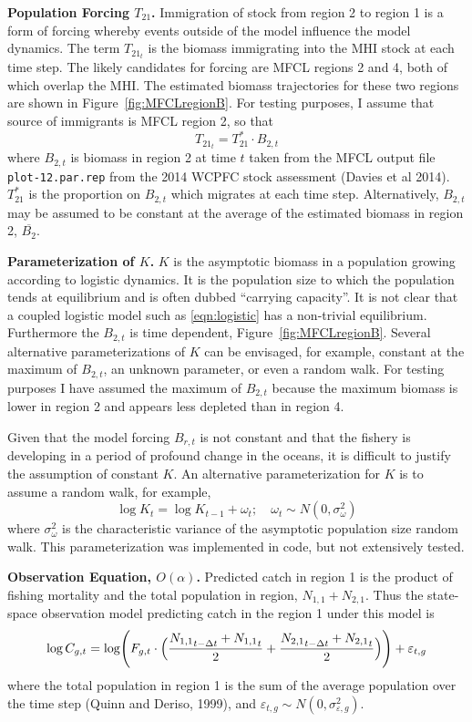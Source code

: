 \documentclass[12pt,letterpaper]{article}
\newcommand\widebar[1]{\overline{#1}}
\newcommand\None{{N_{1,1}}}
\newcommand\Ntwo{{N_{2,1}}}
\begin{document}
{\bf Population Forcing $T_{21}$.}
Immigration of stock from region 2 to region 1 is a
form of forcing whereby events outside of the model influence the
model dynamics. The term $T_{{21}_t}$ is the biomass immigrating
into the MHI stock at each time step. 
The likely candidates for forcing are MFCL regions 2 and 4, both of
which overlap the MHI. The estimated biomass trajectories for these
two regions are shown in Figure~\ref{fig:MFCLregionB}.
For testing purposes,
I assume that source of immigrants is MFCL region 2, so that
\begin{equation}
T_{{21}_t} = T^*_{21}\cdot B_{2,t}
\end{equation}
where $B_{2,t}$ is biomass in region 2 at time $t$ taken from the MFCL output file
{\tt plot-12.par.rep} from the 2014 WCPFC stock assessment
(Davies et al 2014). $T^*_{21}$ is the proportion on
$B_{2,t}$ which migrates at each time step.
Alternatively, $B_{2,t}$ may be assumed to be constant at the average
of the estimated biomass in region 2, $\widebar{B_{2}}$.

{\bf Parameterization of $K$.}
$K$ is the asymptotic biomass in a population growing according to
logistic dynamics. It is the population size to which the population
tends at equilibrium and is often dubbed ``carrying capacity''. 
It is not clear that a coupled logistic model such as
\ref{eqn:logistic} has a non-trivial equilibrium. Furthermore the
$B_{2,t}$ is time dependent, Figure~\ref{fig:MFCLregionB}.
Several alternative
parameterizations of $K$ can be envisaged, for example, constant at
the maximum of $B_{2,t}$, an unknown parameter, or even a random walk.
For testing purposes I have assumed the maximum of $B_{2,t}$ because
the maximum biomass is lower in region 2 and appears less depleted
than in region 4.

Given that the model forcing $B_{r,t}$ is not constant and that the
fishery is developing in a period of profound change in the oceans,
it is difficult to justify the assumption of constant $K$. An
alternative parameterization for $K$ is to assume a random walk, for
example,
\begin{equation}
\log K_t = \log K_{t-1} + \omega_t;\quad \omega_t\sim
N(0,\sigma^2_\omega) \label{eqn:Kwalk}
\end{equation}
where  $\sigma^2_\omega$ is the characteristic variance of the
asymptotic population size random walk.
This parameterization was implemented in code, but not extensively
tested.

{\bf Observation Equation, $O(\alpha)$.}
Predicted catch in region 1 is the product of fishing mortality
and the total population in region, $\None+\Ntwo$.
Thus the state-space observation model predicting catch in the region 1
under this model is
\begin{equation}
\log C_{g,t} = \log \Biggl(F_{g,t}\cdot\Bigl(\frac{\None_{t-\Delta t}+\None_t}{2}
                           +\frac{\Ntwo_{t-\Delta
t}+\Ntwo_t}{2}\Bigr)\Biggr) + \varepsilon_{t,g}
\label{eqn:obs}
\end{equation}
where the total population in region 1 is the sum of the average
population over the time step (Quinn and Deriso, 1999), and
$\varepsilon_{t,g} \sim N(0,\sigma^2_{\varepsilon,g})$.
\end{document}
